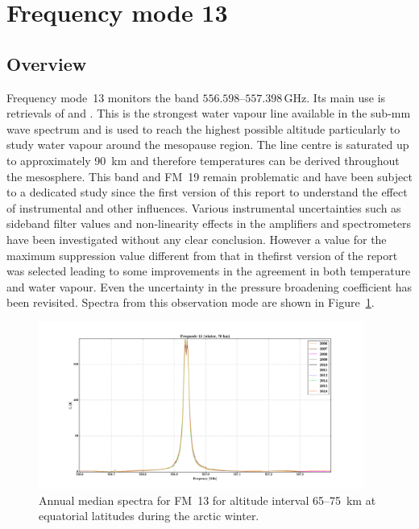 \section{Frequency mode 13}
\label{sec:fm13}

\subsection{Overview}
\label{sec:fm13:overview}
Frequency mode~13 monitors the band $556.598$--$557.398\,\mathrm{GHz}$. Its
main use is retrievals of  and .
This is the strongest water vapour line available in the sub-mm wave spectrum
and is used to reach the  highest possible altitude particularly to study
water vapour around the mesopause region.  The line centre is saturated up to
approximately 90~km and therefore temperatures can be derived throughout the
mesosphere. This band and FM~19 remain problematic and have been subject to a 
dedicated study since the first version of this report  to understand the effect of instrumental 
and other influences.  Various instrumental uncertainties such as sideband filter values and non-linearity effects in the amplifiers and spectrometers have been investigated without any clear conclusion.  However a value for the maximum suppression value different from that in thefirst version of the report was selected leading to some improvements in the agreement in both temperature and water vapour.   Even the uncertainty in the pressure broadening coefficient has been revisited.  
Spectra from this observation mode are shown in Figure~\ref{fig:spectra:13}.

\begin{figure}[ht]
    \centering
    \includegraphics[width=0.95\textwidth]{../DDS/figures/spectra/fm_13_spectra_winter}
    \caption{Annual median spectra for FM~13 for altitude interval 65--75~km at
        equatorial latitudes during the arctic winter.
    }\label{fig:spectra:13}
\end{figure}



